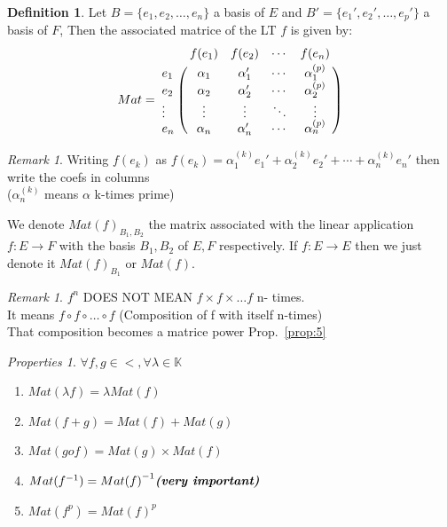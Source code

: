 \documentclass{article}
\theoremstyle{definition}
\newtheorem{definition}[theorem]{Definition}
\theoremstyle{remark}
\newtheorem{remark}[theorem]{Remark}
\newtheorem{prop}[theorem]{Properties}
\numberwithin{equation}{section}
\begin{document}
\begin{definition}
    Let $B = \{e_{1}, e_{2}, \dots, e_{n}\}$ a basis of $E$ 
    and $B'= \{e_{1}', e_{2}', \dots, e_{p}'\}$ a basis of $F$,
    Then the associated matrice of the LT $f$ is given by:
    \[ Mat = 
        \bordermatrix{
            ~      & f(e_{1})   & f(e_{2})    & \cdots  & f(e_{n}) \cr
            e_1    & \alpha_{1} & \alpha_{1}' & \cdots  & \alpha_{1}^{(p)} \cr
            e_2    & \alpha_{2} & \alpha_{2}' & \cdots  & \alpha_{2}^{(p)} \cr
            \vdots & \vdots     & \vdots      & \ddots & \vdots \cr
            e_n    & \alpha_{n} & \alpha_{n}' & \cdots  & \alpha_{n}^{(p)}
        }
    \]
    \begin{remark}
        Writing $f(e_{k})$ as 
        $f(e_k) = \alpha_{1}^{(k)}e_{1}'+\alpha_{2}^{(k)} e_{2}' 
        + \cdots + \alpha_{n}^{(k)} e_{n}'$ 
        then write the coefs in columns\\
        (\(\alpha_n^{(k)}\) means  \(\alpha\) k-times prime)
    \end{remark}

    We denote ${Mat(f)}_{B_{1}, B_{2}}$ the matrix associated with the linear application $f : E \to F$ with the basis $B_{1}, B_{2}$ of $E, F$ respectively. 
    If $f : E \to E$ then we just denote it ${Mat(f)}_{B_{1}}$ or ${Mat(f)}$.
    \begin{remark}
        $f^n$ DOES NOT MEAN $f \times f \times \dots f$ n- times.\\
        It means $f\circ f\circ \dots \circ f$ (Composition of f with itself n-times)\\
        That composition becomes a matrice power Prop.~\ref{prop:5} 
    \end{remark}
     

\end{definition}

\begin{prop}
    \(\forall f, g \in \lt, \forall \lambda \in \mathbb{K}\)
    \begin{enumerate}
        \item \(Mat (\lambda f) = \lambda Mat (f)\)
        \item \(Mat (f + g) = Mat(f) + Mat(g)\)
        \item \(Mat (gof) = Mat(g) \times Mat(f)\)
        \item \(Mat (f^{-1}) = {Mat(f)}^{-1} \emph{\textbf{(very important)}}\)
        \item \(Mat (f^p) = {Mat(f)}^p\)\label{prop:5}
    \end{enumerate}
\end{prop}
\end{document}
